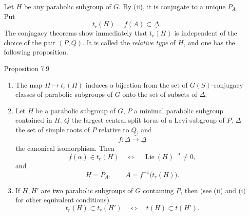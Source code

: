 Let \(H\) be any parabolic subgroup of \(G\).  By
\textup{(ii)}, it is conjugate to a unique \(P_A\).  Put
\[
 t_r(H)=f(A)\subset\underline\Delta.
\]
The conjugacy theorems show immediately that \(t_r(H)\) is
independent of the choice of the pair \((P,Q)\).  It is called
the \emph{relative type} of \(H\), and one has the following
proposition.

\begin{sgastatement}{Proposition 7.9}
\begin{enumerate}[label=\textup{(\roman*)}]
\item The map \(H\mapsto t_r(H)\) induces a bijection from the set of
\(G(S)\)-conjugacy classes of parabolic subgroups of \(G\) onto the
set of subsets of \(\underline\Delta\).
\item Let \(H\) be a parabolic subgroup of \(G\), \(P\) a minimal
parabolic subgroup contained in \(H\), \(Q\) the largest central
split torus of a Levi subgroup of \(P\), \(\Delta\) the set of
simple roots of \(P\) relative to \(Q\), and
\[
 f:\Delta\xrightarrow{\ \sim\ }\underline\Delta
\]
the canonical isomorphism.  Then
\[
 f(\alpha)\in t_r(H)
 \quad\Longleftrightarrow\quad
 \operatorname{Lie}(H)^{-\alpha}\ne0,
\]
and
\[
 H=P_A,\qquad A=f^{-1}\bigl(t_r(H)\bigr).
\]
\item If \(H,H'\) are two parabolic subgroups of \(G\) containing
\(P\), then \textup{(see \textup{(ii)} and
\textup{(i)} for other equivalent conditions)}
\[
 t_r(H)\subset t_r(H')
 \quad\Longleftrightarrow\quad
 t(H)\subset t(H').
\]
\end{enumerate}
\end{sgastatement}
